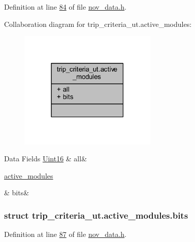 Definition at line \hyperlink{a00022_source_l00084}{84} of file \hyperlink{a00022_source}{nov\+\_\+data.\+h}.



Collaboration diagram for trip\+\_\+criteria\+\_\+ut.\+active\+\_\+modules\+:\nopagebreak
\begin{figure}[H]
\begin{center}
\leavevmode
\includegraphics[width=186pt]{d7/d98/a00983}
\end{center}
\end{figure}
\begin{DoxyFields}{Data Fields}
\hypertarget{a00022_aa181a603769c1f98ad927e7367c7aa51}{\hyperlink{a00072_a59a9f6be4562c327cbfb4f7e8e18f08b}{Uint16}}\label{a00022_aa181a603769c1f98ad927e7367c7aa51}
&
all&
\\
\hline

\hypertarget{a00022_acc411e6c13670e52124629b8ac83f7d0}{\hyperlink{a00022_d9/daf/a00830}{active\+\_\+modules}}\label{a00022_acc411e6c13670e52124629b8ac83f7d0}
&
bits&
\\
\hline

\end{DoxyFields}
\label{d9/daf/a00830}
\hypertarget{a00022_d9/daf/a00830}{}
\subsubsection{struct trip\+\_\+criteria\+\_\+ut.\+active\+\_\+modules.\+bits}


Definition at line \hyperlink{a00022_source_l00087}{87} of file \hyperlink{a00022_source}{nov\+\_\+data.\+h}.



